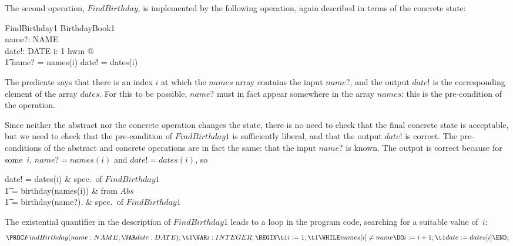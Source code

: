 The second operation, $FindBirthday$, is implemented by the following
operation, again described in terms of the concrete state:
\begin{schema}{FindBirthday1}
	\Xi BirthdayBook1 \\
	name?: NAME \\
	date!: DATE
\where
	\exists i: 1 \upto hwm @ \\
\t1		name? = names(i) \land date! = dates(i)
\end{schema}
The predicate says that there is an index $i$ at which the $names$
array contains the input $name?$, and the output $date!$ is the
corresponding element of the array $dates$.  For this to be possible,
$name?$ must in fact appear somewhere in the array $names$: this is
the pre-condition of the operation. 

Since neither the abstract nor the concrete operation changes the
state, there is no need to check that the final concrete state is
acceptable, but we need to check that the pre-condition of
$FindBirthday1$ is sufficiently liberal, and that the output $date!$
is correct.  The pre-conditions of the abstract and concrete operations
are in fact the same: that the input $name?$ is known. The output is
correct because for some~$i$, $name? = names(i)$ and $date! =
dates(i)$, so
\begin{argue}
	date! = dates(i) &		spec.\ of $FindBirthday1$ \\
\t1	= birthday(names(i)) &		from $Abs$ \\
\t1	= birthday(name?). &		spec.\ of $FindBirthday1$
\end{argue}
The existential quantifier in the description of $FindBirthday1$ leads to
a loop in the program code, searching for a suitable value of~$i$:
\[
	\PROC FindBirthday(name: NAME; \VAR date: DATE); \\
\t1		\VAR i: INTEGER; \\
	\BEGIN \\
\t1		i := 1; \\
\t1		\WHILE names[i] \neq name \DO i := i+1; \\
\t1		date := dates[i] \\
	\END;
\]

